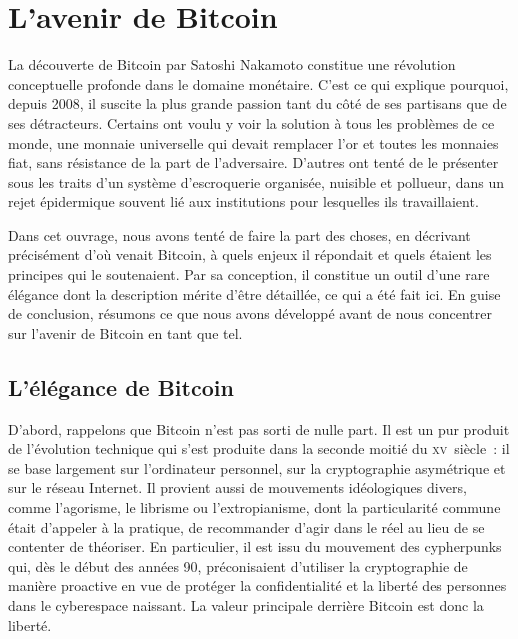 
\chapter{L'avenir de Bitcoin} %
\label{ch:avenir}


La découverte de Bitcoin par Satoshi Nakamoto constitue une révolution conceptuelle profonde dans le domaine monétaire. C'est ce qui explique pourquoi, depuis 2008, il suscite la plus grande passion tant du côté de ses partisans que de ses détracteurs. Certains ont voulu y voir la solution à tous les problèmes de ce monde, une monnaie universelle qui devait remplacer l'or et toutes les monnaies fiat, sans résistance de la part de l'adversaire. D'autres ont tenté de le présenter sous les traits d'un système d'escroquerie organisée, nuisible et pollueur, dans un rejet épidermique souvent lié aux institutions pour lesquelles ils travaillaient.

Dans cet ouvrage, nous avons tenté de faire la part des choses, en décrivant précisément d'où venait Bitcoin, à quels enjeux il répondait et quels étaient les principes qui le soutenaient. Par sa conception, il constitue un outil d'une rare élégance dont la description mérite d'être détaillée, ce qui a été fait ici. En guise de conclusion, résumons ce que nous avons développé avant de nous concentrer sur l'avenir de Bitcoin en tant que tel. %

\section*{L'élégance de Bitcoin}


D'abord, rappelons que Bitcoin n'est pas sorti de nulle part. Il est un pur produit de l'évolution technique qui s'est produite dans la seconde moitié du \textsc{xv}\ieme{}~siècle~: il se base largement sur l'ordinateur personnel, sur la cryptographie asymétrique et sur le réseau Internet. Il provient aussi de mouvements idéologiques divers, comme l'agorisme, le librisme ou l'extropianisme, dont la particularité commune était d'appeler à la pratique, de recommander d'agir dans le réel au lieu de se contenter de théoriser. En particulier, il est issu du mouvement des cypherpunks qui, dès le début des années 90, préconisaient d'utiliser la cryptographie de manière proactive en vue de protéger la confidentialité et la liberté des personnes dans le cyberespace naissant. La valeur principale derrière Bitcoin est donc la liberté.

